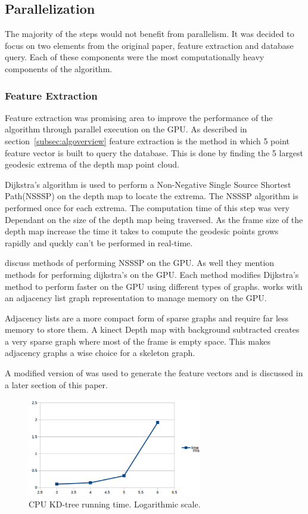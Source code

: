 \documentclass[conference]{IEEEtran}
\begin{document}
\subsection{Parallelization}
The majority of the steps would not benefit from parallelism. It was decided to focus on two elements from the original paper, feature extraction and database query. Each of these components were the most computationally heavy components of the algorithm.

\subsubsection{Feature Extraction}
\label{sec:featureextraction}
Feature extraction was promising area to improve the performance of the algorithm through parallel execution on the GPU. As described in section~\ref{subsec:algoverview} feature extraction is the method in which 5 point feature vector is built to query the database. This is done by finding the 5 largest geodesic extrema of the depth map point cloud.

Dijkstra's algorithm is used to perform a Non-Negative Single Source Shortest Path(NSSSP) on the depth map to locate the extrema. The NSSSP algorithm is performed once for each extrema. The computation time of this step was very Dependant on the size of the depth map being traversed. As the frame size of the depth map increase the time it takes to compute the geodesic points grows rapidly and quckly can't be performed in real-time.

\cite{Ortega-Arranz2013,Toss2014,Ortega-Arranz2015} discuss methods of performing NSSSP on the GPU. As well they mention methods for performing dijkstra's on the GPU. Each method modifies Dijkstra's method to perform faster on the GPU using different types of graphs. \cite{Toss2014} works with an adjacency list graph representation to manage memory on the GPU.

Adjacency lists are a more compact form of sparse graphs and require far less memory to store them. A kinect Depth map with background subtracted creates a very sparse graph where most of the frame is empty space. This makes adjacency graphs a wise choice for a skeleton graph.

A modified version of \cite{Toss2014,Ortega-Arranz2013} was used to generate the feature vectors and is discussed in a later section of this paper.

\begin{figure}[!t]
\centering
\includegraphics[width=3in]{runningtimekdtree}
\caption{CPU KD-tree running time. Logarithmic scale.}
\label{fig:kdtree}
\end{figure}
\end{document}
